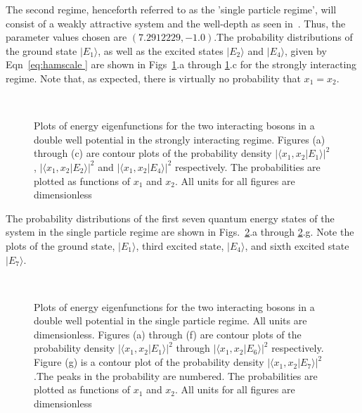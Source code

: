 \documentclass{article}
\begin{document}
The second regime, henceforth referred to as the 'single particle regime', will consist of a weakly attractive system and the well-depth as seen in~\cite{mypaper}. Thus, the parameter values chosen are $\left(7.2912229, -1.0\right)$.The probability distributions of the ground state  $|E_1\rangle$, as well as the excited states  $|E_2\rangle$ and  $|E_4\rangle$, given by Eqn~\ref{eq:hamscale }  are shown in Figs~\ref{fig:wavefunctions_tonks }.a through \ref{fig:wavefunctions_tonks }.c for the strongly interacting regime. Note that, as expected, there is virtually no probability that $x_1=x_2$.
\begin{figure}
\ 
\caption{Plots of energy eigenfunctions for the two interacting bosons in a double well potential in the strongly interacting regime. Figures (a) through (c) are contour plots of the probability density $|\langle x_1,x_2|E_1\rangle|^2$ ,  $|\langle x_1,x_2|E_2\rangle|^2$  and $|\langle x_1,x_2|E_4\rangle|^2$ respectively. The probabilities are plotted as functions of $x_1$ and $x_2$. All units for all figures are dimensionless}
\label{fig:wavefunctions_tonks }
\end{figure}
The probability distributions of the first seven quantum energy states of the system in the single particle regime are shown in Figs.~\ref{fig:wavefunctions }.a through  \ref{fig:wavefunctions }.g. Note the plots of the ground state, $|E_1\rangle$, third excited state, $|E_4\rangle$,  and sixth excited state $|E_7\rangle$. %
\begin{figure}
\ 
\caption{Plots of energy eigenfunctions for the two interacting bosons in a double well potential in the single particle regime. All units are dimensionless. Figures (a) through (f) are contour plots of the probability density $|\langle x_1,x_2|E_1\rangle|^2$ through $|\langle x_1,x_2|E_6\rangle|^2$ respectively. Figure (g) is a contour plot of the probability density
$|\langle x_1,x_2|E_7\rangle|^2$.The peaks in the probability are numbered. The probabilities are plotted as functions of $x_1$ and $x_2$. All units for all figures are dimensionless}
\label{fig:wavefunctions }
\end{figure}
%
\end{document}
